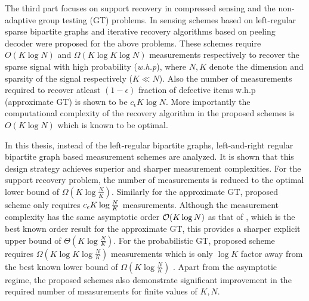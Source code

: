 \indent The third part focuses on support recovery in compressed sensing and the non-adaptive group testing (GT) problems. In \cite{li2015subdraft,lee2015saffron} sensing schemes based on left-regular sparse bipartite graphs and iterative recovery algorithms based on peeling decoder were proposed for the above problems. These schemes require $O(K \log N)$ and $ \Omega(K\log K\log N)$ measurements respectively to recover the sparse signal with high probability (\emph{w.h.p}), where $N,K$ denote the dimension and sparsity of the signal respectively ($K\ll N$). Also the number of measurements required to recover atleast $(1-\epsilon)$ fraction of defective items w.h.p (approximate GT) is shown to be $c_\epsilon K\log N$. More importantly the computational complexity of the recovery algorithm in the proposed schemes is $O(K \log N)$ which is known to be optimal.

In this thesis, instead of the left-regular bipartite graphs, left-and-right regular bipartite graph based measurement schemes are analyzed. It is shown that this design strategy achieves superior and sharper measurement complexities. For the support recovery problem, the number of measurements is reduced to the optimal lower bound of $\Omega\left(K \log \frac{N}{K} \right)$. Similarly for the approximate GT, proposed scheme only requires $c_{\epsilon} K\log \frac{N}{K}$ measurements. Although the measurement complexity has the same asymptotic order $\mathcal{O}(K\log N)$ as that of \cite{lee2015saffron}, which is the best known order result for the approximate GT, this provides a sharper explicit upper bound of $\Theta(K\log \frac{N}{K})$. For the probabilistic GT, proposed scheme requires $\Omega(K\log K \log \frac{N}{K})$ measurements which is only $\log K$ factor away from the best known lower bound of $\Omega(K\log \frac{N}{K})$ \cite{chan2014non}. Apart from the asymptotic regime, the proposed schemes also demonstrate significant improvement in the required number of measurements for finite values of $K,N$. 


